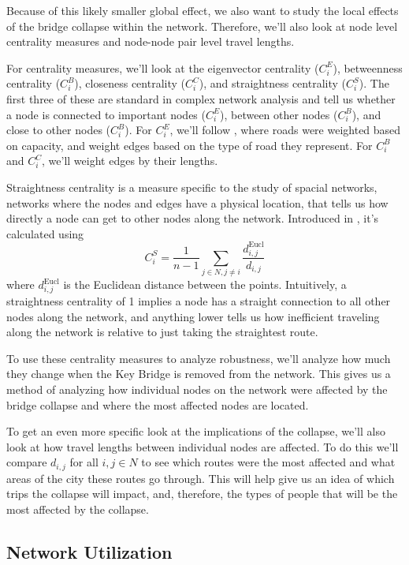 \documentclass[11pt]{article}
\numberwithin{equation}{section} %
\numberwithin{figure}{section} %
\numberwithin{table}{section} %
\theoremstyle{definition}
\begin{document}
Because of this likely smaller global effect, we also want to study the local effects of the bridge collapse within the network. Therefore, we'll also look at node level centrality measures and node-node pair level travel lengths.

For centrality measures, we'll look at the eigenvector centrality ($C^E_i$), betweenness centrality ($C^B_i$), closeness centrality ($C^C_i$), and straightness centrality ($C^S_i$). The first three of these are standard in complex network analysis and tell us whether a node is connected to important nodes ($C^E_i$), between other nodes ($C^B_i$), and close to other nodes ($C^B_i$). For $C_i^E$, we'll follow \cite{Ando20}, where roads were weighted based on capacity, and weight edges based on the type of road they represent. For $C^B_i$ and $C^C_i$, we'll weight edges by their lengths.

Straightness centrality is a measure specific to the study of spacial networks, networks where the nodes and edges have a physical location, that tells us how directly a node can get to other nodes along the network. Introduced in \cite{Porta06}, it's calculated using 
\[
  C_i^S = \frac{1}{n-1} \sum_{j \in N, j \neq i} \frac{d_{i, j}^\text{Eucl}}{d_{i, j}}
\]
where $d_{i, j}^\text{Eucl}$ is the Euclidean distance between the points. Intuitively, a straightness centrality of 1 implies a node has a straight connection to all other nodes along the network, and anything lower tells us how inefficient traveling along the network is relative to just taking the straightest route.

To use these centrality measures to analyze robustness, we'll analyze how much they change when the Key Bridge is removed from the network. This gives us a method of analyzing how individual nodes on the network were affected by the bridge collapse and where the most affected nodes are located.

To get an even more specific look at the implications of the collapse, we'll also look at how travel lengths between individual nodes are affected. To do this we'll compare $d_{i, j}$ for all $i, j \in N$ to see which routes were the most affected and what areas of the city these routes go through. This will help give us an idea of which trips the collapse will impact, and, therefore, the types of people that will be the most affected by the collapse.


\subsection{Network Utilization}
\end{document}
